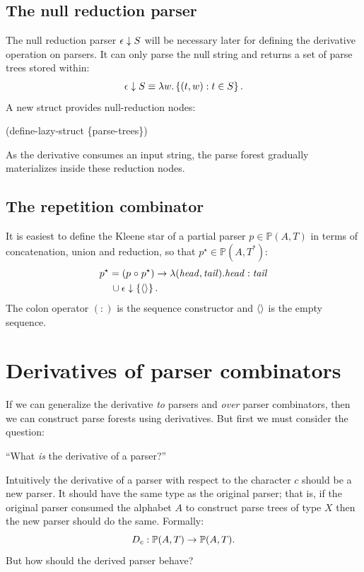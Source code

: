 \subsection{The null reduction parser}
The null reduction parser $\epsilon \downarrow S$ will be necessary later for
defining the derivative operation on parsers.
%
It can only parse the null string and returns a set of parse trees stored
within:
\begin{align*}
 \epsilon \downarrow S
 \equiv
 \lambda w . \left\{  (t,w)  :  t \in S \right\}
 \text.
\end{align*}
A new struct provides null-reduction nodes:
\begin{code}
 (define-lazy-struct \ttepsred \{parse-trees\}) \end{code}
%
As the derivative consumes an input string, the parse forest gradually materializes inside these reduction nodes.


\subsection{The repetition combinator}
It is easiest to define the Kleene star of a partial parser $p \in \mathbb{P}(A,T)$
in terms of concatenation, union and reduction, so that $p^\star \in \mathbb{P}(A,T^*)$:
\begin{align*}
p^\star &= (p \mathrel{\circ} p^\star) \to \lambda (\mathit{head},\mathit{tail}) . \mathit{head} : \mathit{tail}
\\
        &\,\cup \epsilon \downarrow \left\{\langle \rangle\right\}
\text.
\end{align*}
%
The colon operator $(:)$ is the sequence constructor and $\langle \rangle$ is the empty sequence.







\section{Derivatives of parser combinators}

If we can generalize the derivative \emph{to} parsers and \emph{over} parser
combinators, then we can construct parse forests using derivatives.
%
But first we must consider the question:
\begin{center}
``What \emph{is} the derivative of a parser?''
\end{center}


Intuitively the derivative of a parser with respect to the character $c$
should be a new parser.
%
It should have the same type as the original parser; that is,
if the original parser consumed the alphabet $A$ to construct
parse trees of type $X$ then the new parser should do the same.
%
Formally:
%
\begin{equation*}
  D_c : \mathbb{P}(A,T) \to \mathbb{P}(A,T)
  \text.
\end{equation*}
%
But how should the derived parser behave?


